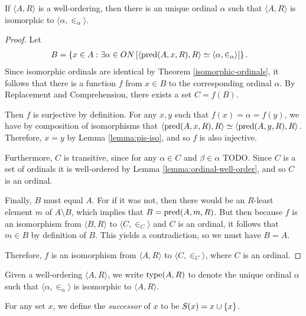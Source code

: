 \begin{thm}\label{thm:unique-isomorphic-ordinal}
    If $\langle A, R\rangle$ is a well-ordering, then there is an unique ordinal $\alpha$ such that $\langle A, R\rangle$ is isomorphic to $\langle \alpha, \in_{\alpha}\rangle$.
\end{thm}

\begin{proof}
    Let
    \begin{align*}
        B &= \left\{x \in A : \exists \alpha\in ON\left[\langle \operatorname{pred}(A, x, R), R\rangle \simeq \langle \alpha, \in_{\alpha}\rangle\right]\right\}.
    \end{align*}
    Since isomorphic ordinals are identical by Theorem \ref{isomorphic-ordinals}, it follows that there is a function $f$ from $x \in B$ to the corresponding ordinal $\alpha$. By Replacement and Comprehension, there exists a set $C = f(B)$.

    Then $f$ is surjective by definition. For any $x, y$ such that $f(x) =\alpha = f(y)$, we have by composition of isomorphisms that $\langle \operatorname{pred}(A, x, R), R\rangle \simeq \langle \operatorname{pred}(A, y, R), R\rangle$. Therefore, $x = y$ by Lemma \ref{lemma:pis-iso}, and so $f$ is also injective.

    Furthermore, $C$ is transitive, since for any $\alpha \in C$ and $\beta \in \alpha$ {\color{red}TODO}. Since $C$ is a set of ordinals it is well-ordered by Lemma \ref{lemma:ordinal-well-order}, and so $C$ is an ordinal.

    Finally, $B$ must equal $A$. For if it was not, then there would be an $R$-least element $m$ of $A\setminus B$, which implies that $B = \operatorname{pred}(A, m, R)$. But then because $f$ is an isomorphism from $\langle B, R\rangle$ to $\langle C, \in_{C}\rangle$ and $C$ is an ordinal, it follows that $m \in B$ by definition of $B$. This yields a contradiction, so we must have $B = A$.

    Therefore, $f$ is an isomorphism from $\langle A, R\rangle$ to $\langle C, \in_{C}\rangle$, where $C$ is an ordinal.
\end{proof}

\begin{defn}
    Given a well-ordering $\langle A, R\rangle$, we write $\operatorname{type}(A, R)$ to denote the unique ordinal $\alpha$ such that $\langle \alpha, \in_{\alpha}\rangle$ is isomorphic to $\langle A, R\rangle$.
\end{defn}

\begin{defn}
    For any set $x$, we define the \emph{successor} of $x$ to be $S(x) = x \cup \{x\}$.
\end{defn}

